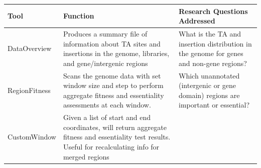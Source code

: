 \documentclass[11pt,]{article}
\begin{document}
\begin{longtable}[]{@{}lll@{}}
\toprule
\begin{minipage}[b]{0.13\columnwidth}\raggedright\strut
Tool\strut
\end{minipage} & \begin{minipage}[b]{0.40\columnwidth}\raggedright\strut
Function\strut
\end{minipage} & \begin{minipage}[b]{0.38\columnwidth}\raggedright\strut
Research Questions Addressed\strut
\end{minipage}\tabularnewline
\midrule
\endhead
\begin{minipage}[t]{0.13\columnwidth}\raggedright\strut
DataOverview\strut
\end{minipage} & \begin{minipage}[t]{0.40\columnwidth}\raggedright\strut
Produces a summary file of information about TA sites and insertions in
the genome, libraries, and gene/intergenic regions\strut
\end{minipage} & \begin{minipage}[t]{0.38\columnwidth}\raggedright\strut
What is the TA and insertion distribution in the genome for genes and
non-gene regions?\strut
\end{minipage}\tabularnewline
\begin{minipage}[t]{0.13\columnwidth}\raggedright\strut
RegionFitness\strut
\end{minipage} & \begin{minipage}[t]{0.40\columnwidth}\raggedright\strut
Scans the genome data with set window size and step to perform aggregate
fitness and essentiality assessments at each window.\strut
\end{minipage} & \begin{minipage}[t]{0.38\columnwidth}\raggedright\strut
Which unannotated (intergenic or gene domain) regions are important or
essential?\strut
\end{minipage}\tabularnewline
\begin{minipage}[t]{0.13\columnwidth}\raggedright\strut
CustomWindow\strut
\end{minipage} & \begin{minipage}[t]{0.40\columnwidth}\raggedright\strut
Given a list of start and end coordinates, will return aggregate fitness
and essentiality test results. Useful for recalculating info for merged
regions\strut
\end{minipage} & \begin{minipage}[t]{0.38\columnwidth}\raggedright\strut

\end{minipage}
\end{longtable}
\end{document}
